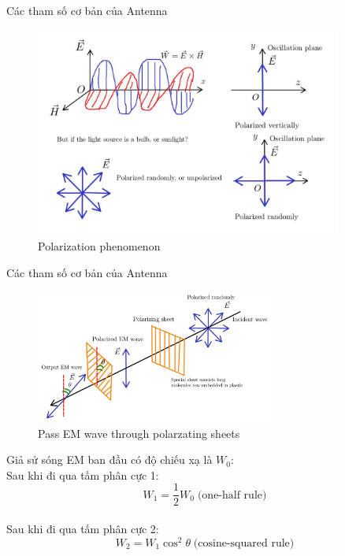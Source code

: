 \documentclass[8pt]{beamer}
\begin{document}
\begin{frame}{Các tham số cơ bản của Antenna}
\begin{figure}[h]
			\includegraphics[width=0.9\textwidth]{polar.jpg}
			\caption{Polarization phenomenon}			\label{fig:re2}
\end{figure}

\end{frame}
\begin{frame}{Các tham số cơ bản của Antenna}
\begin{figure}[h]
			\includegraphics[width=0.7\textwidth]{incident.jpg}
			\caption{Pass EM wave through polarzating sheets}			\label{fig:re2}
\end{figure}
Giả sử sóng EM ban đầu có độ chiếu xạ là $W_{0}$:\\
Sau khi đi qua tấm phân cực 1: $$W_{1}=\frac{1}{2}W_{0}\;\text{(one-half rule)}$$
\\ Sau khi đi qua tấm phân cực 2: $$W_{2}=W_{1}\cos^2{\theta}\;\text{(cosine-squared rule)}$$
\end{frame}
\end{document}
